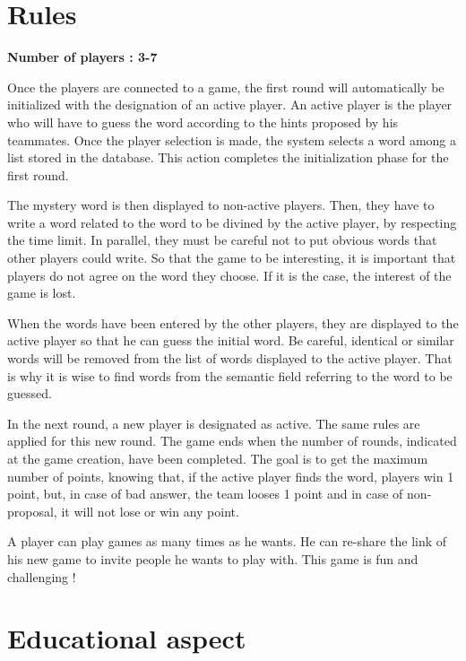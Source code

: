 \documentclass{tnreport}
\begin{document}
\clearpage

\section{Rules}

\label{chapter:rules}

\textbf{Number of players : 3-7}

Once the players are connected to a game, the first round will automatically be initialized with the designation of an active player. An active player is the player who will have to guess the word according to the hints proposed by his teammates. Once the player selection is made, the system selects a word among a list stored in the database. This action completes the initialization phase for the first round. 

The mystery word is then displayed to non-active players. Then, they have to write a word related to the word to be divined by the active player, by respecting the time limit. In parallel, they must be careful not to put obvious words that other players could write. So that the game to be interesting, it is important that players do not agree on the word they choose. If it is the case, the interest of the game is lost. 

When the words have been entered by the other players, they are displayed to the active player so that he can guess the initial word. Be careful, identical or similar words will be removed from the list of words displayed to the active player. That is why it is wise to find words from the semantic field referring to the word to be guessed. 

In the next round, a new player is designated as active. The same rules are applied for this new round. The game ends when the number of rounds, indicated at the game creation, have been completed. The goal is to get the maximum number of points, knowing that, if the active player finds the word, players win 1 point, but, in case of bad answer, the team looses 1 point and in case of non-proposal, it will not lose or win any point. 

A player can play games as many times as he wants. He can re-share the link of his new game to invite people he wants to play with. This game is fun and challenging !

\section{Educational aspect}
\end{document}

